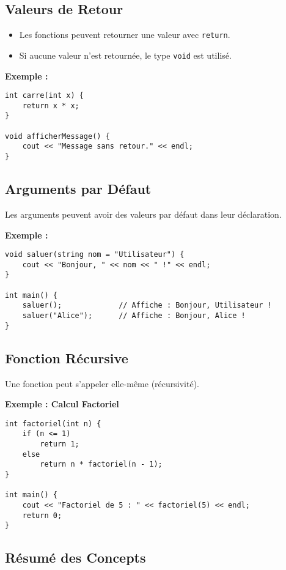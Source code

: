 \subsection{ Valeurs de Retour}
\begin{itemize}
    \item Les fonctions peuvent retourner une valeur avec \texttt{return}.
    \item Si aucune valeur n'est retournée, le type \texttt{void} est utilisé.
\end{itemize}

\textbf{Exemple :}
\begin{tcolorbox}[colframe=blue!50!black, colback=blue!5!white, title=Exemple de Valeurs de Retour]
\begin{verbatim}
int carre(int x) {
    return x * x;
}

void afficherMessage() {
    cout << "Message sans retour." << endl;
}
\end{verbatim}
\end{tcolorbox}

\subsection{ Arguments par Défaut}
Les arguments peuvent avoir des valeurs par défaut dans leur déclaration.

\textbf{Exemple :}
\begin{tcolorbox}[colframe=blue!50!black, colback=blue!5!white, title=Exemple d'Arguments par Défaut]
\begin{verbatim}
void saluer(string nom = "Utilisateur") {
    cout << "Bonjour, " << nom << " !" << endl;
}

int main() {
    saluer();             // Affiche : Bonjour, Utilisateur !
    saluer("Alice");      // Affiche : Bonjour, Alice !
}
\end{verbatim}
\end{tcolorbox}

\subsection{ Fonction Récursive}
Une fonction peut s'appeler elle-même (récursivité).

\textbf{Exemple : Calcul Factoriel}
\begin{tcolorbox}[colframe=blue!50!black, colback=blue!5!white, title=Exemple de Fonction Récursive]
\begin{verbatim}
int factoriel(int n) {
    if (n <= 1)
        return 1;
    else
        return n * factoriel(n - 1);
}

int main() {
    cout << "Factoriel de 5 : " << factoriel(5) << endl;
    return 0;
}
\end{verbatim}
\end{tcolorbox}

\subsection{ Résumé des Concepts}
\begin{center}
\end{center}
